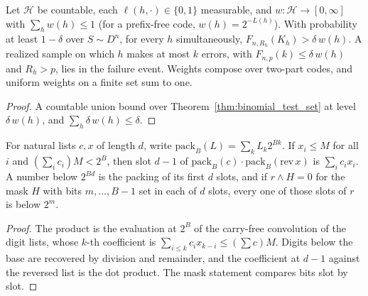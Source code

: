 \begin{theorem}\label{thm:occam_binomial}
\leanok
{}
Let $\mathcal H$ be countable, each $\ell(h,\cdot)\in\{0,1\}$ measurable, and
$w:\mathcal H\to[0,\infty]$ with $\sum_h w(h)\le1$ (for a prefix-free code,
$w(h)=2^{-L(h)}$). With probability at least $1-\delta$ over $S\sim D^n$, for
every $h$ simultaneously, $F_{n,R_h}(K_h)>\delta\,w(h)$. A realized sample on
which $h$ makes at most $k$ errors, with $F_{n,p}(k)\le\delta\,w(h)$ and
$R_h>p$, lies in the failure event. Weights compose over two-part codes, and
uniform weights on a finite set sum to one.
\end{theorem}
\begin{proof}
\leanok
A countable union bound over Theorem~\ref{thm:binomial_test_set} at level
$\delta\,w(h)$, and $\sum_h\delta\,w(h)\le\delta$.
\end{proof}

\begin{lemma}\label{lem:kronecker_dot}
\leanok
For natural lists $c,x$ of length $d$, write
$\mathrm{pack}_B(L)=\sum_k L_k2^{Bk}$. If $x_i\le M$ for all $i$ and
$(\sum_i c_i)M<2^B$, then slot $d-1$ of
$\mathrm{pack}_B(c)\cdot\mathrm{pack}_B(\mathrm{rev}\,x)$ is
$\sum_i c_ix_i$. A number below $2^{Bd}$ is the packing of its first $d$
slots, and if $r\wedge H=0$ for the mask $H$ with bits $m,\dots,B-1$ set in
each of $d$ slots, every one of those slots of $r$ is below $2^m$.
\end{lemma}
\begin{proof}
\leanok
The product is the evaluation at $2^B$ of the carry-free convolution of the
digit lists, whose $k$-th coefficient is $\sum_{i\le k}c_ix_{k-i}\le(\sum c)M$.
Digits below the base are recovered by division and remainder, and the
coefficient at $d-1$ against the reversed list is the dot product. The mask
statement compares bits slot by slot.
\end{proof}

